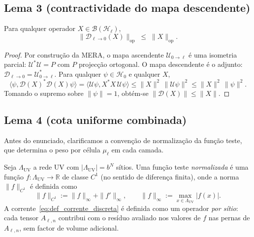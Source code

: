 \subsection{Lema 3 (contractividade do mapa descendente)}

\begin{lemma}\label{lem:descend}
Para qualquer operador $X \in \mathcal{B}(\mathcal{H}_\ell)$,
\begin{equation}
  \bigl\|\mathcal{D}_{\ell \to 0}(X)\bigr\|_{\mathrm{op}}
  \;\le\; \|X\|_{\mathrm{op}}.
  \label{eq:lema3}
\end{equation}
\end{lemma}

\begin{proof}
Por construção da MERA, o mapa ascendente $\mathcal{U}_{0\to\ell}$
é uma isometria parcial: $\mathcal{U}^* \mathcal{U} = P$ com $P$
projecção ortogonal. O mapa descendente é o adjunto:
$\mathcal{D}_{\ell\to 0} = \mathcal{U}_{0\to\ell}^*$. Para qualquer
$\psi \in \mathcal{H}_0$ e qualquer $X$,
\[
  \langle \psi, \mathcal{D}(X)^* \mathcal{D}(X) \psi \rangle
  = \langle \mathcal{U}\psi, X^*X\, \mathcal{U}\psi \rangle
  \le \|X\|^2\,\|\mathcal{U}\psi\|^2 \le \|X\|^2\,\|\psi\|^2.
\]
Tomando o supremo sobre $\|\psi\|=1$, obtém-se
$\|\mathcal{D}(X)\| \le \|X\|$.
\end{proof}

\subsection{Lema 4 (cota uniforme combinada)}

Antes do enunciado, clarificamos a convenção de normalização da
função teste, que determina o peso por célula $\mu_\ell$ em cada
camada.

\begin{definition}\label{def:f_normalizada}
Seja $\Lambda_{\mathrm{UV}}$ a rede UV com $|\Lambda_{\mathrm{UV}}| = b^N$
sítios. Uma função teste \emph{normalizada} é uma função
$f: \Lambda_{\mathrm{UV}} \to \mathbb{R}$ de classe $C^1$ (no sentido
de diferença finita), onde a norma $\|f\|_{C^1}$ é definida como
\[
  \|f\|_{C^1} := \|f\|_\infty + \|f'\|_\infty,
  \qquad \|f\|_\infty := \max_{x \in \Lambda_{\mathrm{UV}}} |f(x)|.
\]
A corrente~\eqref{eq:def_corrente_discreta} é definida como um operador
\emph{por sítio}: cada tensor $A_{\ell,n}$ contribui com o resíduo
avaliado nos valores de $f$ nas pernas de $A_{\ell,n}$, sem factor
de volume adicional.
\end{definition}


